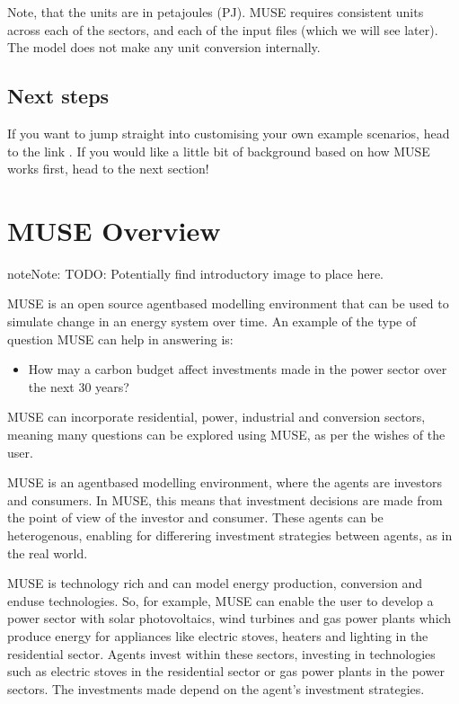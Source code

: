 \documentclass[letterpaper,10pt,english]{sphinxmanual}
\begin{document}
Note, that the units are in petajoules (PJ). MUSE requires consistent units across each of the sectors, and each of the input files (which we will see later). The model does not make any unit conversion internally.


\section{Next steps}
\label{\detokenize{running-muse-example:Next-steps}}
If you want to jump straight into customising your own example scenarios, head to the link {\hyperref[\detokenize{user-guide/index::doc}]{}}. If you would like a little bit of background based on how MUSE works first, head to the next section!


\chapter{MUSE Overview}
\label{\detokenize{overview:muse-overview}}\label{\detokenize{overview::doc}}
\begin{sphinxadmonition}{note}{Note:}
TODO: Potentially find introductory image to place here.
\end{sphinxadmonition}

MUSE is an open source agent\sphinxhyphen{}based modelling environment that can be used to simulate change in an energy system over time. An example of the type of question MUSE can help in answering is:
\begin{itemize}
\item {} 
How may a carbon budget affect investments made in the power sector over the next 30 years?

\end{itemize}

MUSE can incorporate residential, power, industrial and conversion sectors, meaning many questions can be explored using MUSE, as per the wishes of the user.

MUSE is an agent\sphinxhyphen{}based modelling environment, where the agents are investors and consumers. In MUSE, this means that investment decisions are made from the point of view of the investor and consumer. These agents can be heterogenous, enabling for differering investment strategies between agents, as in the real world.

MUSE is technology rich and can model energy production, conversion and end\sphinxhyphen{}use technologies. So, for example, MUSE can enable the user to develop a power sector with solar photovoltaics, wind turbines and gas power plants which produce energy for appliances like electric stoves, heaters and lighting in the residential sector. Agents invest within these sectors, investing in technologies such as electric stoves in the residential sector or gas power plants in the power sectors. The investments made depend on the agent’s investment strategies.
\end{document}
